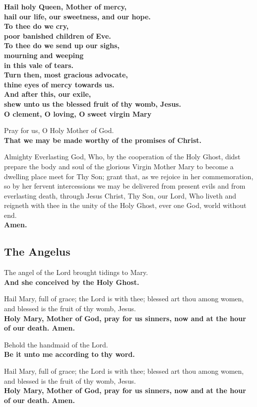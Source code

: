\textbf{Hail holy Queen, Mother of mercy,\\
hail our life, our sweetness, and our hope.\\
To thee do we cry,\\
poor banished children of Eve.\\
To thee do we send up our sighs,\\
mourning and weeping\\
in this vale of tears.\\
Turn then, most gracious advocate,\\
thine eyes of mercy towards us.\\
And after this, our exile,\\
shew unto us the blessed fruit of thy womb, Jesus.\\
O clement, O loving, O sweet virgin Mary}

Pray for us, O Holy Mother of God.\\
\textbf{That we may be made worthy of the promises of Christ.}

Almighty Everlasting God, Who, by the cooperation of the Holy Ghost, didst prepare the body and soul of the
glorious Virgin Mother Mary to become a dwelling place meet for Thy Son;
grant that, as we rejoice in her commemoration, so by her fervent intercessions we may be delivered from present evils and from everlasting death,
through Jesus Christ, Thy Son, our Lord, Who liveth and reigneth with thee in the unity of the Holy Ghost, ever one God, world without end.\\
\textbf{Amen.}

\clearpage

\subsection{The Angelus}

The angel of the Lord brought tidings to Mary.\\
\textbf{And she conceived by the Holy Ghost.}

Hail Mary, full of grace; the Lord is with thee; blessed art thou among women, and blessed is the fruit of thy womb, Jesus.\\
\textbf{Holy Mary, Mother of God, pray for us sinners, now and at the hour of our death. Amen.}

Behold the handmaid of the Lord.\\
\textbf{Be it unto me according to thy word.}

Hail Mary, full of grace; the Lord is with thee; blessed art thou among women, and blessed is the fruit of thy womb, Jesus.\\
\textbf{Holy Mary, Mother of God, pray for us sinners, now and at the hour of our death. Amen.}

